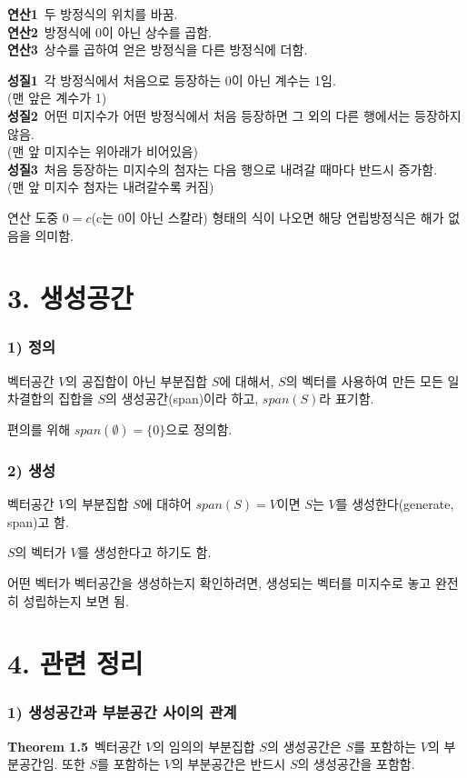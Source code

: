 \documentclass[10pt, a4paper]{article}
\begin{document}
\textbf{연산1} \,두 방정식의 위치를 바꿈.\\
\textbf{연산2} \,방정식에 0이 아닌 상수를 곱함.\\
\textbf{연산3} \,상수를 곱하여 얻은 방정식을 다른 방정식에 더함.

\textbf{성질1} \,각 방정식에서 처음으로 등장하는 0이 아닌 계수는 1임.\\(맨 앞은 계수가 1)\\
\textbf{성질2} \,어떤 미지수가 어떤 방정식에서 처음 등장하면 그 외의 다른 행에서는 등장하지 않음.\\(맨 앞 미지수는 위아래가 비어있음)\\
\textbf{성질3} \,처음 등장하는 미지수의 첨자는 다음 행으로 내려갈 때마다 반드시 증가함.\\(맨 앞 미지수 첨자는 내려갈수록 커짐)

연산 도중 $0=c$(c는 0이 아닌 스칼라) 형태의 식이 나오면 해당 연립방정식은 해가 없음을 의미함.\\


\newpage


\section*{3. 생성공간}

\subsubsection*{1) 정의}
벡터공간 $V$의 공집합이 아닌 부분집합 $S$에 대해서, $S$의 벡터를 사용하여 만든 모든 일차결합의 집합을 $S$의 생성공간(span)이라 하고, $span(S)$라 표기함.

편의를 위해 $span(\emptyset)= \{ 0 \}$으로 정의함.

\subsubsection*{2) 생성}
벡터공간 $V$의 부분집합 $S$에 대햐어 $span(S)=V$이면 $S$는 $V$를 생성한다(generate, span)고 함.

$S$의 벡터가 $V$를 생성한다고 하기도 함.

어떤 벡터가 벡터공간을 생성하는지 확인하려면, 생성되는 벡터를 미지수로 놓고 완전히 성립하는지 보면 됨.\\

\section*{4. 관련 정리}
\subsubsection*{1) 생성공간과 부분공간 사이의 관계}
\textbf{Theorem 1.5}\, 벡터공간 $V$의 임의의 부분집합 $S$의 생성공간은 $S$를 포함하는 $V$의 부분공간임. 또한 $S$를 포함하는 $V$의 부분공간은 반드시 $S$의 생성공간을 포함함.
\end{document}
